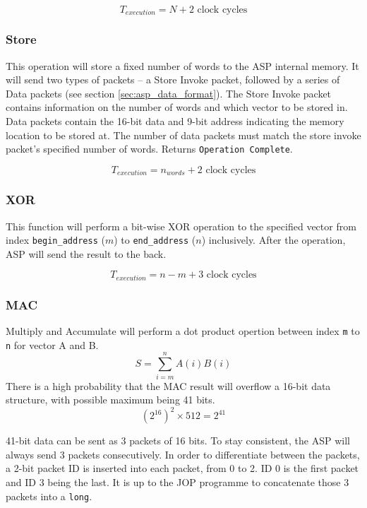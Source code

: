\documentclass[]{article}
\begin{document}
	$$T_{execution} = N + 2 \text{ clock cycles}$$
	
	\subsubsection{Store}
	This operation will store a fixed number of words to the ASP internal memory. It will send two types of packets -- a Store Invoke packet, followed by a series of Data packets (see section \ref{sec:asp_data_format}). The Store Invoke packet contains information on the number of words and which vector to be stored in. Data packets contain the 16-bit data and 9-bit address indicating the memory location to be stored at. The number of data packets must match the store invoke packet's specified number of words. Returns \texttt{Operation Complete}.
	
	$$T_{execution} = n_{words} + 2 \text{ clock cycles}$$
	
	\subsubsection{XOR}
	This function will perform a bit-wise XOR operation to the specified vector from index \texttt{begin\_address} ($m$) to \texttt{end\_address} ($n$) inclusively. After the operation, ASP will send the result to the back.
	
	$$T_{execution} = n - m + 3 \text{ clock cycles}$$
	
	\subsubsection{MAC}
	Multiply and Accumulate will perform a dot product opertion between index \texttt{m} to \texttt{n} for vector A and B. 
	\begin{equation}
	S = \sum_{i=m}^{n}A(i)B(i)
	\end{equation}
	There is a high probability that the MAC result will overflow a 16-bit data structure, with possible maximum being 41 bits.
	\begin{equation}
	(2^{16})^2 \times 512 = 2^{41}
	\end{equation}
	
	\par
	41-bit data can be sent as 3 packets of 16 bits. To stay consistent, the ASP will always send 3 packets consecutively. In order to differentiate between the packets, a 2-bit packet ID is inserted into each packet, from 0 to 2. ID 0 is the first packet and ID 3 being the last. It is up to the JOP programme to concatenate those 3 packets into a \texttt{long}.
	
\end{document}

